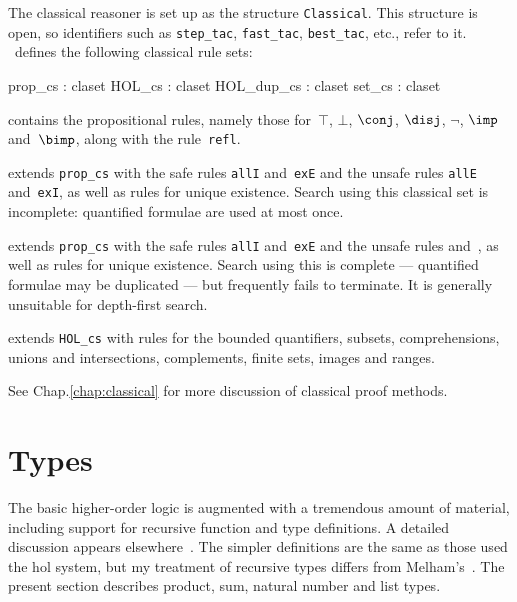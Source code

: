 The classical reasoner is set up as the structure
{\tt Classical}.  This structure is open, so {\ML} identifiers such
as {\tt step_tac}, {\tt fast_tac}, {\tt best_tac}, etc., refer to it.
\HOL\ defines the following classical rule sets:
\begin{ttbox} 
prop_cs    : claset
HOL_cs     : claset
HOL_dup_cs : claset
set_cs     : claset
\end{ttbox}
\begin{ttdescription}
\item[\ttindexbold{prop_cs}] contains the propositional rules, namely
those for~$\top$, $\bot$, $\conj$, $\disj$, $\neg$, $\imp$ and~$\bimp$,
along with the rule~{\tt refl}.

\item[\ttindexbold{HOL_cs}] extends {\tt prop_cs} with the safe rules
  {\tt allI} and~{\tt exE} and the unsafe rules {\tt allE}
  and~{\tt exI}, as well as rules for unique existence.  Search using
  this classical set is incomplete: quantified formulae are used at most
  once.

\item[\ttindexbold{HOL_dup_cs}] extends {\tt prop_cs} with the safe rules
  {\tt allI} and~{\tt exE} and the unsafe rules 
  and~, as well as rules for unique existence.  Search using
  this is complete --- quantified formulae may be duplicated --- but
  frequently fails to terminate.  It is generally unsuitable for
  depth-first search.

\item[\ttindexbold{set_cs}] extends {\tt HOL_cs} with rules for the bounded
  quantifiers, subsets, comprehensions, unions and intersections,
  complements, finite sets, images and ranges.
\end{ttdescription}
\noindent
See %
        {Chap.\ts\ref{chap:classical}} 
for more discussion of classical proof methods.


\section{Types}
The basic higher-order logic is augmented with a tremendous amount of
material, including support for recursive function and type definitions.  A
detailed discussion appears elsewhere~\cite{paulson-coind}.  The simpler
definitions are the same as those used the {\sc hol} system, but my
treatment of recursive types differs from Melham's~\cite{melham89}.  The
present section describes product, sum, natural number and list types.

